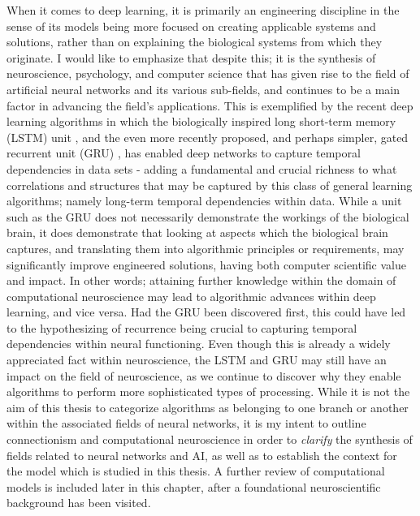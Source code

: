 When it comes to deep learning, it is primarily an engineering discipline in the sense of its models being more focused on creating applicable systems and solutions, rather than on explaining the biological systems from which they originate. I would like to emphasize that despite this; it is the synthesis of neuroscience, psychology, and computer science that has given rise to the field of artificial neural networks \citep{McCulloch1943} and its various sub-fields, and continues to be a main factor in advancing the field's applications. This is exemplified by the recent deep learning algorithms in which the biologically inspired long short-term memory (LSTM) unit \citep{Hochreiter1997}, and the even more recently proposed, and perhaps simpler, gated recurrent unit (GRU) \citep{Mnih2015}, has enabled deep networks to capture temporal dependencies in data sets - adding a fundamental and crucial richness to what correlations and structures that may be captured by this class of general learning algorithms; namely long-term temporal dependencies within data. 
While a unit such as the GRU does not necessarily demonstrate the workings of the biological brain, it does demonstrate that looking at aspects which the biological brain captures, and translating them into algorithmic principles or requirements, may significantly improve engineered solutions, having both computer scientific value and impact. In other words; attaining further knowledge within the domain of computational neuroscience may lead to algorithmic advances within deep learning, and vice versa. Had the GRU been discovered first, this could have led to the hypothesizing of recurrence being crucial to capturing temporal dependencies within neural functioning. Even though this is already a widely appreciated fact within neuroscience, the LSTM and GRU may still have an impact on the field of neuroscience, as we continue to discover why they enable algorithms to perform more sophisticated types of processing. While it is not the aim of this thesis to categorize algorithms as belonging to one branch or another within the associated fields of neural networks, it is my intent to outline connectionism and computational neuroscience in order to \textit{clarify} the synthesis of fields related to neural networks and AI, as well as to establish the context for the model which is studied in this thesis. A further review of computational models is included later in this chapter, after a foundational neuroscientific background has been visited.


